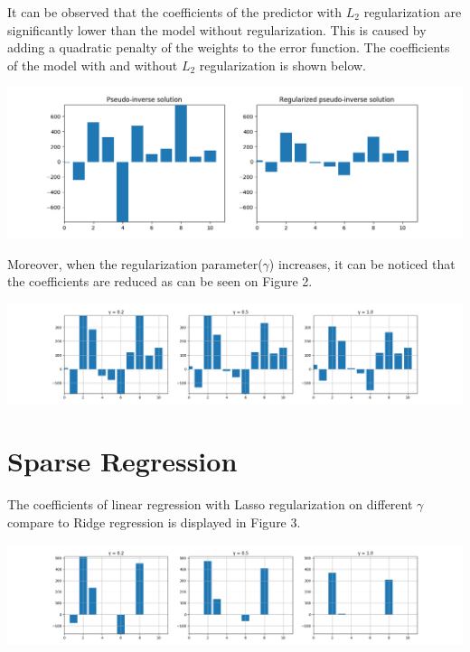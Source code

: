 \documentclass{article}
\begin{document}
It can be observed that the coefficients of the predictor with $L_2$ regularization are significantly lower than the model without regularization. This is caused by adding a quadratic penalty of the weights to the error function. The coefficients of the model with and without $L_2$ regularization is shown below.
\begin{center}
\includegraphics[scale=0.4]{reg_weights_compare}
\end{center}

Moreover, when the regularization parameter($\gamma$) increases, it can be noticed that the coefficients are reduced as can be seen on Figure 2.
\begin{center}
\includegraphics[scale=0.3]{ridge_weights_compare}
\end{center}

\section{Sparse Regression}

The coefficients of linear regression with Lasso regularization on different $\gamma$ compare to Ridge regression is displayed in Figure 3.
\begin{center}
\includegraphics[scale=0.3]{lasso_compare}
\end{center}
\end{document}
